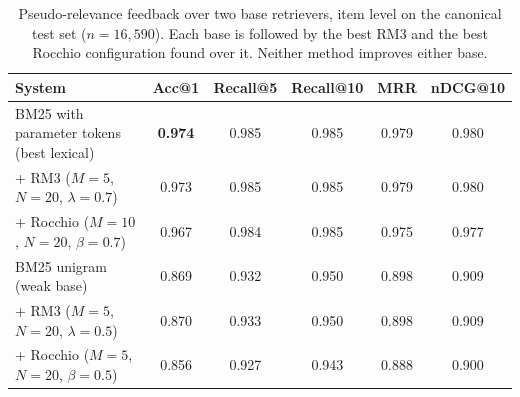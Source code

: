 \begin{table}[ht]
\centering
\caption{Pseudo-relevance feedback over two base retrievers, item level on the canonical test set ($n=16{,}590$). Each base is followed by the best RM3 and the best Rocchio configuration found over it. Neither method improves either base.}
\label{tab:prf_comparison}
\begin{tabular}{lccccc}
\toprule
\textbf{System} & \textbf{Acc@1} & \textbf{Recall@5} & \textbf{Recall@10} & \textbf{MRR} & \textbf{nDCG@10} \\
\midrule
BM25 with parameter tokens (best lexical) & \textbf{0.974} & 0.985 & 0.985 & 0.979 & 0.980 \\
\quad + RM3 ($M{=}5$, $N{=}20$, $\lambda{=}0.7$) & 0.973 & 0.985 & 0.985 & 0.979 & 0.980 \\
\quad + Rocchio ($M{=}10$, $N{=}20$, $\beta{=}0.7$) & 0.967 & 0.984 & 0.985 & 0.975 & 0.977 \\
BM25 unigram (weak base) & 0.869 & 0.932 & 0.950 & 0.898 & 0.909 \\
\quad + RM3 ($M{=}5$, $N{=}20$, $\lambda{=}0.5$) & 0.870 & 0.933 & 0.950 & 0.898 & 0.909 \\
\quad + Rocchio ($M{=}5$, $N{=}20$, $\beta{=}0.5$) & 0.856 & 0.927 & 0.943 & 0.888 & 0.900 \\
\bottomrule
\end{tabular}
\end{table}
